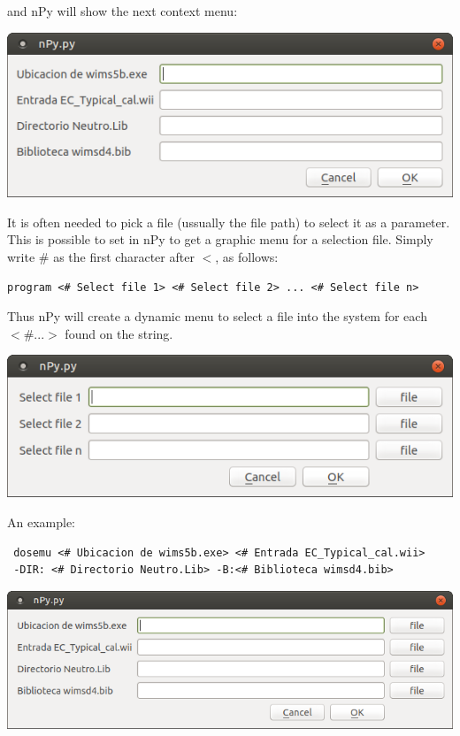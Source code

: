 \documentclass[a4paper,10pt]{article}
\begin{document}
 \noindent and nPy will show the next context menu:
\begin{center}
 \includegraphics[width=\textwidth]{img/contextMenuString.png}
\end{center}

\bigskip 

It is often needed to pick a file (ussually the file path) to select it as a parameter. This is possible to set in nPy to get a graphic menu for a selection file. Simply write $\#$ as the first character after $<$, as follows: 

\begin{verbatim}
program <# Select file 1> <# Select file 2> ... <# Select file n>
 \end{verbatim}

Thus nPy will create a dynamic menu to select a file into the system for each $<\# ...>$ found on the 
string.

\begin{center}
 \includegraphics[width=\textwidth]{img/contextMenuExampleFile.png}
\end{center}

\noindent An example:

\begin{verbatim}
 dosemu <# Ubicacion de wims5b.exe> <# Entrada EC_Typical_cal.wii> 
 -DIR: <# Directorio Neutro.Lib> -B:<# Biblioteca wimsd4.bib>
 \end{verbatim}

\begin{center}
 \includegraphics[width=\textwidth]{img/contextMenuFile.png}
\end{center}
\end{document}
